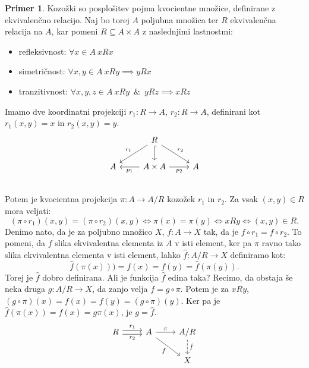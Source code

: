 \documentclass[12pt,a4paper]{book}
\theoremstyle{definition}
\theoremstyle{plain}
\theoremstyle{definition}
\newtheorem{primer}{Primer}[section]
\theoremstyle{remark}
\begin{document}
\begin{primer}
Kozožki so posplošitev pojma kvocientne množice, definirane z ekvivalenčno relacijo. Naj bo torej $A$ poljubna množica ter $R$ ekvivalenčna relacija na $A$, kar pomeni $R \subseteq A \times A$ z naslednjimi lastnostmi:
\begin{itemize}
\item refleksivnost: $\forall x \in A \ xRx$
\item simetričnost: $\forall x,y \in A \ xRy \implies yRx$
\item tranzitivnost: $\forall x,y,z \in A \ xRy \enspace\&\enspace yRz \implies xRz$
\end{itemize}
Imamo dve koordinatni projekciji $r_1 : R \to A$, $r_2 : R \to A$, definirani kot $r_1(x,y) = x$ in $r_2(x,y) = y$.
%
$$\begin{tikzcd}
& R \ar[dl, "r_1"'] \ar[d, hook] \ar[dr, "r_2"] & \\
A & A \times A \ar[l, "p_1"] \ar[r, "p_2"'] & A \\
\end{tikzcd}$$
Potem je kvocientna projekcija $\pi : A \to A/R$ kozožek $r_1$ in $r_2$.
Za vsak $(x,y) \in R$ mora veljati:
$$(\pi \circ r_1)(x,y) = (\pi \circ r_2)(x,y) \Leftrightarrow \pi(x) = \pi(y) \Leftrightarrow xRy \Leftrightarrow (x,y) \in R.$$ 
Denimo nato, da je za poljubno množico $X$, $f: A \to X$ tak, da je $f \circ r_1 = f \circ r_2$. To pomeni, da $f$ slika ekvivalentna elementa iz $A$ v isti element, ker pa $\pi$ ravno tako slika ekvivalentna elementa v isti element, lahko $\hat{f}:A/R \to X$ definiramo kot:
$$\hat{f}(\pi(x)) ) = f(x) = f(y) = \hat{f}(\pi(y)).$$
Torej je $\hat{f}$ dobro definirana. Ali je funkcija $\hat{f}$ edina taka? Recimo, da obstaja še neka druga $g : A/R \to X$, da zanjo velja $f = g \circ \pi$. Potem je za $xRy$, $(g \circ \pi)(x) = f(x) = f(y) = (g \circ\pi)(y)$. Ker pa je $\hat{f}(\pi(x)) = f(x) = g\pi(x)$, je $g = \hat{f}$.
%
$$\begin{tikzcd}
R \ar[r, shift left, "r_1"] \ar[r, shift right, "r_2"'] & A \ar[r, "\pi"] \ar[dr, "f"'] & A/R \ar[d, dashed, "\hat{f}"] \\
& & X \\
\end{tikzcd}$$

\end{primer}
\end{document}
